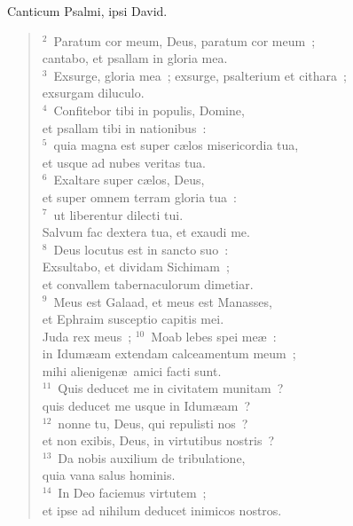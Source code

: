 \lettrine[lines=3,image=true,loversize=0.05,lraise=-0.03]{C}{}anticum Psalmi, ipsi David.
\begin{flushleft}\begin{verse}\vspace{6pt}${}^{2}$~Paratum cor meum, Deus, paratum cor meum~;\\ cantabo, et psallam in gloria mea.\\
${}^{3}$~Exsurge, gloria mea~; exsurge, psalterium et cithara~;\\ exsurgam diluculo.\\
${}^{4}$~Confitebor tibi in populis, Domine,\\ et psallam tibi in nationibus~:\\
${}^{5}$~quia magna est super c\ae los misericordia tua,\\ et usque ad nubes veritas tua.\\
${}^{6}$~Exaltare super c\ae los, Deus,\\ et super omnem terram gloria tua~:\\
${}^{7}$~ut liberentur dilecti tui.\\ Salvum fac dextera tua, et exaudi me.\\
${}^{8}$~Deus locutus est in sancto suo~:\\ Exsultabo, et dividam Sichimam~;\\ et convallem tabernaculorum dimetiar.\\
${}^{9}$~Meus est Galaad, et meus est Manasses,\\ et Ephraim susceptio capitis mei.\\ Juda rex meus~;
${}^{10}$~Moab lebes spei me\ae~:\\ in Idum\ae am extendam calceamentum meum~;\\ mihi alienigen\ae\ amici facti sunt.\\
${}^{11}$~Quis deducet me in civitatem munitam~?\\ quis deducet me usque in Idum\ae am~?\\
${}^{12}$~nonne tu, Deus, qui repulisti nos~?\\ et non exibis, Deus, in virtutibus nostris~?\\
${}^{13}$~Da nobis auxilium de tribulatione,\\ quia vana salus hominis.\\
${}^{14}$~In Deo faciemus virtutem~;\\ et ipse ad nihilum deducet inimicos nostros.\end{verse}\end{flushleft}



